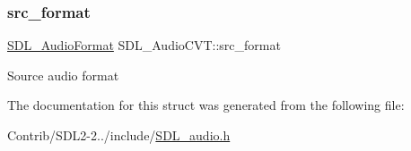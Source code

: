 \subsubsection{\texorpdfstring{src\+\_\+format}{src\_format}}
{\footnotesize\ttfamily \mbox{\hyperlink{_s_d_l__audio_8h_a491ed103fd25d920c4e6b7495217ce66}{S\+D\+L\+\_\+\+Audio\+Format}} S\+D\+L\+\_\+\+Audio\+C\+V\+T\+::src\+\_\+format}

Source audio format 

The documentation for this struct was generated from the following file\+:\begin{DoxyCompactItemize}
\item 
Contrib/\+S\+D\+L2-\/2../include/\mbox{\hyperlink{_s_d_l__audio_8h}{S\+D\+L\+\_\+audio.\+h}}\end{DoxyCompactItemize}
